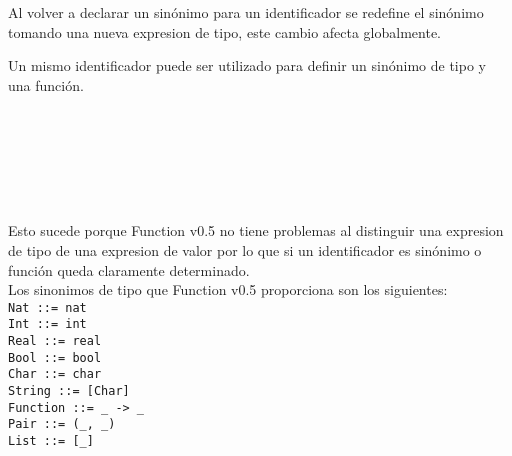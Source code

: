       \begin{fxcode}
          
      \end{fxcode}
      
      Al volver a declarar un sinónimo para un identificador se redefine el sinónimo tomando una nueva expresion de tipo, este cambio afecta globalmente.
      
      \begin{fxcode}
          
      \end{fxcode}
      
      Un mismo identificador puede ser utilizado para definir un sinónimo de tipo y una función.
      
      \begin{fxcode}
         \\
         \\
         \\
         \\
         \\
      \end{fxcode}
      
      Esto sucede porque Function v0.5 no tiene problemas al distinguir una expresion de tipo de una expresion de valor por lo que si un identificador es sinónimo o función queda claramente determinado.
      \\
      
      Los sinonimos de tipo que Function v0.5 proporciona son los siguientes:
      \\
      
      \texttt{Nat      ::= nat    }\\
      \texttt{Int      ::= int    }\\
      \texttt{Real     ::= real   }\\
      \texttt{Bool     ::= bool   }\\
      \texttt{Char     ::= char   }\\
      \texttt{String   ::= [Char] }\\
      \texttt{Function ::= \_ ->~\_ }\\
      \texttt{Pair     ::= (\_, \_) }\\
      \texttt{List     ::= [\_]    }
      \\
      
